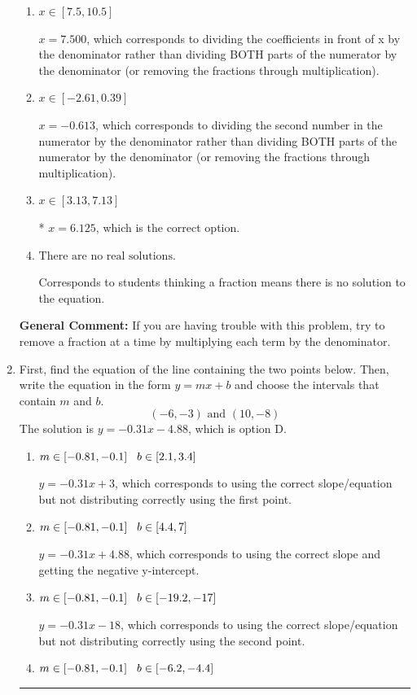 \documentclass{extbook}[14pt]
\newcommand{\litem}[1]{\item #1

\rule{\textwidth}{0.4pt}}
\begin{document}
\begin{enumerate}
{\begin{enumerate}[label=\Alph*.]
 $x = -6.375$, which corresponds to not distributing the negative in front of the second fraction.
\item \( x \in [7.5, 10.5] \)

 $x = 7.500$, which corresponds to dividing the coefficients in front of x by the denominator rather than dividing BOTH parts of the numerator by the denominator (or removing the fractions through multiplication).
\item \( x \in [-2.61, 0.39] \)

 $x = -0.613$, which corresponds to dividing the second number in the numerator by the denominator rather than dividing BOTH parts of the numerator by the denominator (or removing the fractions through multiplication).
\item \( x \in [3.13, 7.13] \)

* $x = 6.125$, which is the correct option.
\item \( \text{There are no real solutions.} \)

Corresponds to students thinking a fraction means there is no solution to the equation.
\end{enumerate}

\textbf{General Comment:} If you are having trouble with this problem, try to remove a fraction at a time by multiplying each term by the denominator.
}
\litem{
First, find the equation of the line containing the two points below. Then, write the equation in the form $ y=mx+b $ and choose the intervals that contain $m$ and $b$.
\[ (-6, -3) \text{ and } (10, -8) \]The solution is \( y = -0.31x -4.88 \), which is option D.\begin{enumerate}[label=\Alph*.]
\item \( m \in [-0.81, -0.1] \hspace*{3mm} b \in [2.1, 3.4] \)

 $y = -0.31x + 3$, which corresponds to using the correct slope/equation but not distributing correctly using the first point.
\item \( m \in [-0.81, -0.1] \hspace*{3mm} b \in [4.4, 7] \)

 $y = -0.31x + 4.88$, which corresponds to using the correct slope and getting the negative y-intercept.
\item \( m \in [-0.81, -0.1] \hspace*{3mm} b \in [-19.2, -17] \)

 $y = -0.31x -18$, which corresponds to using the correct slope/equation but not distributing correctly using the second point.
\item \( m \in [-0.81, -0.1] \hspace*{3mm} b \in [-6.2, -4.4] \)


\end{enumerate}}
\end{enumerate}
\end{document}
